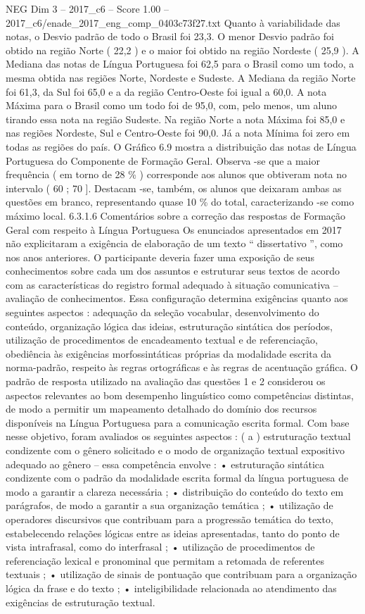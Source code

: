 \begin{textsample}{NEG Dim 3 – 2017\_c6 – Score 1.00 – 2017\_c6/enade\_2017\_eng\_comp\_0403c73f27.txt}
Quanto à variabilidade das notas, o Desvio padrão de todo o Brasil foi 23,3.
O menor Desvio padrão foi obtido na região Norte ( 22,2 ) e o maior foi obtido na região Nordeste ( 25,9 ).
A Mediana das notas de Língua Portuguesa foi 62,5 para o Brasil como um todo, a mesma obtida nas regiões Norte, Nordeste e Sudeste.
A Mediana da região Norte foi 61,3, da Sul foi 65,0 e a da região Centro-Oeste foi igual a 60,0.
A nota Máxima para o Brasil como um todo foi de 95,0, com, pelo menos, um aluno tirando essa nota na região Sudeste.
Na região Norte a nota Máxima foi 85,0 e nas regiões Nordeste, Sul e Centro-Oeste foi 90,0.
Já a nota Mínima foi zero em todas as regiões do país.
O Gráfico 6.9 mostra a distribuição das notas de Língua Portuguesa do Componente de Formação Geral.
Observa -se que a maior frequência ( em torno de 28 \% ) corresponde aos alunos que obtiveram nota no intervalo ( 60 ; 70 ].
Destacam -se, também, os alunos que deixaram ambas as questões em branco, representando quase 10 \% do total, caracterizando -se como máximo local. 6.3.1.6 Comentários sobre a correção das respostas de Formação Geral com respeito à Língua Portuguesa Os enunciados apresentados em 2017 não explicitaram a exigência de elaboração de um texto “ dissertativo ”, como nos anos anteriores.
O participante deveria fazer uma exposição de seus conhecimentos sobre cada um dos assuntos e estruturar seus textos de acordo com as características do registro formal adequado à situação comunicativa – avaliação de conhecimentos.
Essa configuração determina exigências quanto aos seguintes aspectos : adequação da seleção vocabular, desenvolvimento do conteúdo, organização lógica das ideias, estruturação sintática dos períodos, utilização de procedimentos de encadeamento textual e de referenciação, obediência às exigências morfossintáticas próprias da modalidade escrita da norma-padrão, respeito às regras ortográficas e às regras de acentuação gráfica.
O padrão de resposta utilizado na avaliação das questões 1 e 2 considerou os aspectos relevantes ao bom desempenho linguístico como competências distintas, de modo a permitir um mapeamento detalhado do domínio dos recursos disponíveis na Língua Portuguesa para a comunicação escrita formal.
Com base nesse objetivo, foram avaliados os seguintes aspectos : ( a ) estruturação textual condizente com o gênero solicitado e o modo de organização textual expositivo adequado ao gênero – essa competência envolve : • estruturação sintática condizente com o padrão da modalidade escrita formal da língua portuguesa de modo a garantir a clareza necessária ; • distribuição do conteúdo do texto em parágrafos, de modo a garantir a sua organização temática ; • utilização de operadores discursivos que contribuam para a progressão temática do texto, estabelecendo relações lógicas entre as ideias apresentadas, tanto do ponto de vista intrafrasal, como do interfrasal ; • utilização de procedimentos de referenciação lexical e pronominal que permitam a retomada de referentes textuais ; • utilização de sinais de pontuação que contribuam para a organização lógica da frase e do texto ; • inteligibilidade relacionada ao atendimento das exigências de estruturação textual.

\end{textsample}
